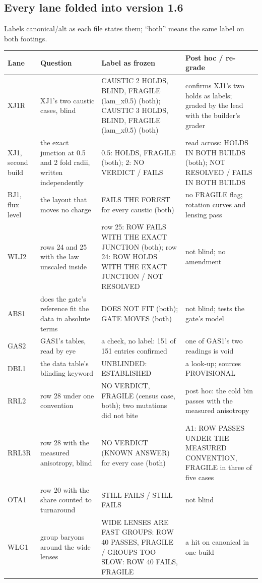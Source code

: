 \documentclass[10pt]{article}
\begin{document}
\subsection{Every lane folded into version 1.6}
Labels canonical/alt as each file states them; ``both'' means the same label on both footings.
{\footnotesize
\begin{longtable}{@{}p{1.6cm}p{3.8cm}p{5.6cm}p{4.7cm}@{}}\toprule
Lane & Question & Label as frozen & Post hoc / re-grade\\\midrule\endhead
XJ1R & XJ1's two caustic cases, blind & CAUSTIC 2 HOLDS, BLIND, FRAGILE (lam\_x0.5) (both); CAUSTIC 3 HOLDS, BLIND, FRAGILE (lam\_x0.5) (both) & confirms XJ1's two holds as labels; graded by the lead with the builder's grader\\
XJ1, second build & the exact junction at 0.5 and 2 fold radii, written independently & 0.5: HOLDS, FRAGILE (both); 2: NO VERDICT / FAILS & read across: HOLDS IN BOTH BUILDS (both); NOT RESOLVED / FAILS IN BOTH BUILDS\\
BJ1, flux level & the layout that moves no charge & FAILS THE FOREST for every caustic (both) & no FRAGILE flag; rotation curves and lensing pass\\
WLJ2 & rows 24 and 25 with the law unscaled inside & row 25: ROW FAILS WITH THE EXACT JUNCTION (both); row 24: ROW HOLDS WITH THE EXACT JUNCTION / NOT RESOLVED & not blind; no amendment\\
ABS1 & does the gate's reference fit the data in absolute terms & DOES NOT FIT (both); GATE MOVES (both) & not blind; tests the gate's model\\
GAS2 & GAS1's tables, read by eye & a check, no label: 151 of 151 entries confirmed & one of GAS1's two readings is void\\
DBL1 & the data table's blinding keyword & UNBLINDED: ESTABLISHED & a look-up; sources PROVISIONAL\\
RRL2 & row 28 under one convention & NO VERDICT, FRAGILE (census case, both); two mutations did not bite & post hoc: the cold bin passes with the measured anisotropy\\
RRL3R & row 28 with the measured anisotropy, blind & NO VERDICT (KNOWN ANSWER) for every case (both) & A1: ROW PASSES UNDER THE MEASURED CONVENTION, FRAGILE in three of five cases\\
OTA1 & row 20 with the share counted to turnaround & STILL FAILS / STILL FAILS & not blind\\
WLG1 & group baryons around the wide lenses & WIDE LENSES ARE FAST GROUPS: ROW 40 PASSES, FRAGILE / GROUPS TOO SLOW: ROW 40 FAILS, FRAGILE & a hit on canonical in one build\\

\end{longtable}}
\end{document}
